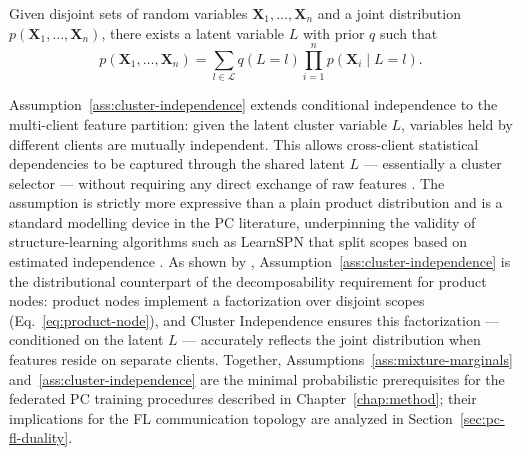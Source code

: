 \begin{assumption}%
\label{ass:cluster-independence}
Given disjoint sets of random variables $\mathbf{X}_1, \ldots, \mathbf{X}_n$ and a joint distribution $p(\mathbf{X}_1, \ldots, \mathbf{X}_n)$, there exists a latent variable $L$ with prior $q$ such that
\[
  p(\mathbf{X}_1, \ldots, \mathbf{X}_n)
  = \sum_{l \in \mathcal{L}} q(L = l)\prod_{i=1}^{n} p(\mathbf{X}_i \mid L = l).
\]
\end{assumption}

Assumption~\ref{ass:cluster-independence} extends conditional independence to the multi-client feature partition: given the latent cluster variable $L$, variables held by different clients are mutually independent.
This allows cross-client statistical dependencies to be captured through the shared latent $L$ — essentially a cluster selector — without requiring any direct exchange of raw features \cite{Seng2025ScalingPC}.
The assumption is strictly more expressive than a plain product distribution and is a standard modelling device in the PC literature, underpinning the validity of structure-learning algorithms such as LearnSPN that split scopes based on estimated independence \cite{Gens2013LearningTS}.
As shown by \textcite{Seng2025ScalingPC}, Assumption~\ref{ass:cluster-independence} is the distributional counterpart of the decomposability requirement for product nodes: product nodes implement a factorization over disjoint scopes (Eq.~\eqref{eq:product-node}), and Cluster Independence ensures this factorization — conditioned on the latent $L$ — accurately reflects the joint distribution when features reside on separate clients.
Together, Assumptions~\ref{ass:mixture-marginals}
and~\ref{ass:cluster-independence} are the minimal probabilistic prerequisites for the federated PC training procedures described in Chapter~\ref{chap:method}; their implications for the FL communication topology are analyzed in Section~\ref{sec:pc-fl-duality}.

